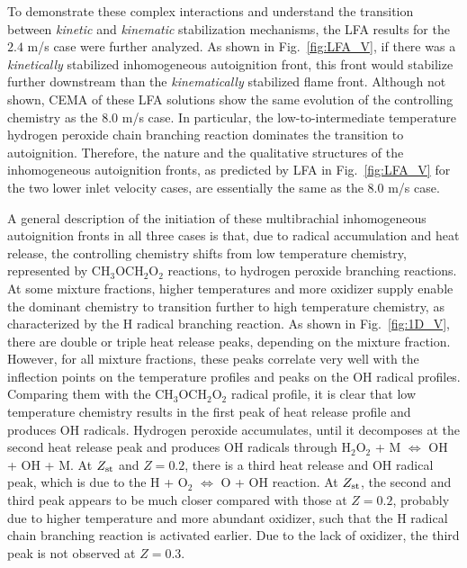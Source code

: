 \documentclass[review,3p,times]{elsarticle}
\begin{document}
To demonstrate these complex interactions and understand the transition between \emph{kinetic} and \emph{kinematic} stabilization mechanisms, the LFA results for the $2.4$ m/s case were further analyzed.  As shown in Fig.~\ref{fig:LFA_V}, if there was a \emph{kinetically} stabilized inhomogeneous autoignition front, this front would stabilize further downstream than the \emph{kinematically} stabilized flame front.  Although not shown, CEMA of these LFA solutions show the same evolution of the controlling chemistry as the $8.0$ m/s case.  In particular, the low-to-intermediate temperature hydrogen peroxide chain branching reaction dominates the transition to autoignition.  Therefore, the nature and the qualitative structures of the inhomogeneous autoignition fronts, as predicted by LFA in Fig.~\ref{fig:LFA_V} for the two lower inlet velocity cases, are essentially the same as the $8.0$ m/s case.  

A general description of the initiation of these multibrachial inhomogeneous autoignition fronts in all three cases is that, due to radical accumulation and heat release, the controlling chemistry shifts from low temperature chemistry, represented by CH$_3$OCH$_2$O$_2$ reactions, to hydrogen peroxide branching reactions.  At some mixture fractions, higher temperatures and more oxidizer supply enable the dominant chemistry to transition further to high temperature chemistry, as characterized by the H radical branching reaction.  As shown in Fig.~\ref{fig:1D_V}, there are double or triple heat release peaks, depending on the mixture fraction.  However, for all mixture fractions, these peaks correlate very well with the inflection points on the temperature profiles and peaks on the OH radical profiles.  Comparing them with the CH$_3$OCH$_2$O$_2$ radical profile, it is clear that low temperature chemistry results in the first peak of heat release profile and produces OH radicals.  Hydrogen peroxide accumulates, until it decomposes at the second heat release peak and produces OH radicals through H$_2$O$_2$ + M $\Longleftrightarrow$ OH + OH + M.  At $Z_{\rm st}$ and $Z = 0.2$, there is a third heat release and OH radical peak, which is due to the H + O$_2$ $\Longleftrightarrow$ O + OH reaction.  At $Z_{\rm st}$, the second and third peak appears to be much closer compared with those at $Z = 0.2$, probably due to higher temperature and more abundant oxidizer, such that the H radical chain branching reaction is activated earlier.  Due to the lack of oxidizer, the third peak is not observed at $Z = 0.3$.  
\end{document}
